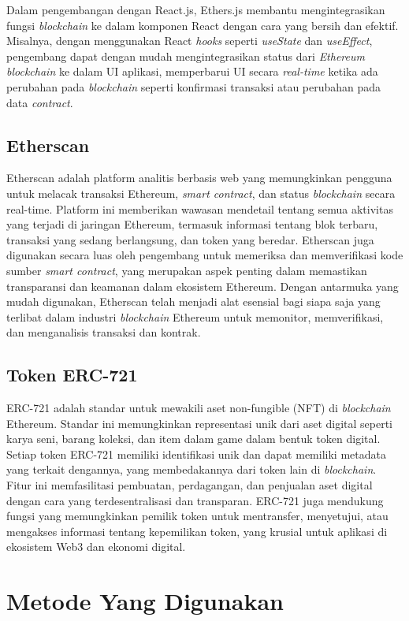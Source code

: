 Dalam pengembangan dengan React.js, Ethers.js membantu mengintegrasikan fungsi \emph{blockchain} ke dalam komponen React dengan cara yang bersih dan efektif. Misalnya, dengan menggunakan React \emph{hooks} seperti \emph{useState} dan \emph{useEffect}, pengembang dapat dengan mudah mengintegrasikan status dari \emph{Ethereum blockchain} ke dalam UI aplikasi, memperbarui UI secara \emph{real-time} ketika ada perubahan pada \emph{blockchain} seperti konfirmasi transaksi atau perubahan pada data \emph{contract}.

\subsection{Etherscan}
Etherscan adalah platform analitis berbasis web yang memungkinkan pengguna untuk melacak transaksi Ethereum, \emph{smart contract}, dan status \emph{blockchain} secara real-time. Platform ini memberikan wawasan mendetail tentang semua aktivitas yang terjadi di jaringan Ethereum, termasuk informasi tentang blok terbaru, transaksi yang sedang berlangsung, dan token yang beredar. Etherscan juga digunakan secara luas oleh pengembang untuk memeriksa dan memverifikasi kode sumber \emph{smart contract}, yang merupakan aspek penting dalam memastikan transparansi dan keamanan dalam ekosistem Ethereum. Dengan antarmuka yang mudah digunakan, Etherscan telah menjadi alat esensial bagi siapa saja yang terlibat dalam industri \emph{blockchain} Ethereum untuk memonitor, memverifikasi, dan menganalisis transaksi dan kontrak.

\subsection{Token ERC-721}
ERC-721 adalah standar untuk mewakili aset non-fungible (NFT) di \emph{blockchain} Ethereum. Standar ini memungkinkan representasi unik dari aset digital seperti karya seni, barang koleksi, dan item dalam game dalam bentuk token digital. Setiap token ERC-721 memiliki identifikasi unik dan dapat memiliki metadata yang terkait dengannya, yang membedakannya dari token lain di \emph{blockchain}. Fitur ini memfasilitasi pembuatan, perdagangan, dan penjualan aset digital dengan cara yang terdesentralisasi dan transparan. ERC-721 juga mendukung fungsi yang memungkinkan pemilik token untuk mentransfer, menyetujui, atau mengakses informasi tentang kepemilikan token, yang krusial untuk aplikasi di ekosistem Web3 dan ekonomi digital.

\section{Metode Yang Digunakan}

